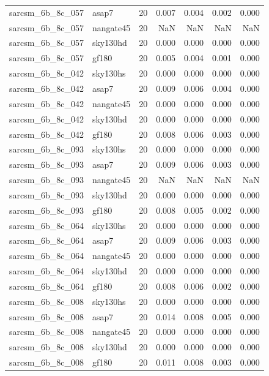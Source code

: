 \begin{tabular}{llrrrrr}
sarcsm\_6b\_8c\_057 & asap7 & 20 & 0.007 & 0.004 & 0.002 & 0.000 \\
sarcsm\_6b\_8c\_057 & nangate45 & 20 & NaN & NaN & NaN & NaN \\
sarcsm\_6b\_8c\_057 & sky130hd & 20 & 0.000 & 0.000 & 0.000 & 0.000 \\
sarcsm\_6b\_8c\_057 & gf180 & 20 & 0.005 & 0.004 & 0.001 & 0.000 \\
sarcsm\_6b\_8c\_042 & sky130hs & 20 & 0.000 & 0.000 & 0.000 & 0.000 \\
sarcsm\_6b\_8c\_042 & asap7 & 20 & 0.009 & 0.006 & 0.004 & 0.000 \\
sarcsm\_6b\_8c\_042 & nangate45 & 20 & 0.000 & 0.000 & 0.000 & 0.000 \\
sarcsm\_6b\_8c\_042 & sky130hd & 20 & 0.000 & 0.000 & 0.000 & 0.000 \\
sarcsm\_6b\_8c\_042 & gf180 & 20 & 0.008 & 0.006 & 0.003 & 0.000 \\
sarcsm\_6b\_8c\_093 & sky130hs & 20 & 0.000 & 0.000 & 0.000 & 0.000 \\
sarcsm\_6b\_8c\_093 & asap7 & 20 & 0.009 & 0.006 & 0.003 & 0.000 \\
sarcsm\_6b\_8c\_093 & nangate45 & 20 & NaN & NaN & NaN & NaN \\
sarcsm\_6b\_8c\_093 & sky130hd & 20 & 0.000 & 0.000 & 0.000 & 0.000 \\
sarcsm\_6b\_8c\_093 & gf180 & 20 & 0.008 & 0.005 & 0.002 & 0.000 \\
sarcsm\_6b\_8c\_064 & sky130hs & 20 & 0.000 & 0.000 & 0.000 & 0.000 \\
sarcsm\_6b\_8c\_064 & asap7 & 20 & 0.009 & 0.006 & 0.003 & 0.000 \\
sarcsm\_6b\_8c\_064 & nangate45 & 20 & 0.000 & 0.000 & 0.000 & 0.000 \\
sarcsm\_6b\_8c\_064 & sky130hd & 20 & 0.000 & 0.000 & 0.000 & 0.000 \\
sarcsm\_6b\_8c\_064 & gf180 & 20 & 0.008 & 0.006 & 0.002 & 0.000 \\
sarcsm\_6b\_8c\_008 & sky130hs & 20 & 0.000 & 0.000 & 0.000 & 0.000 \\
sarcsm\_6b\_8c\_008 & asap7 & 20 & 0.014 & 0.008 & 0.005 & 0.000 \\
sarcsm\_6b\_8c\_008 & nangate45 & 20 & 0.000 & 0.000 & 0.000 & 0.000 \\
sarcsm\_6b\_8c\_008 & sky130hd & 20 & 0.000 & 0.000 & 0.000 & 0.000 \\
sarcsm\_6b\_8c\_008 & gf180 & 20 & 0.011 & 0.008 & 0.003 & 0.000 \\

\end{tabular}

